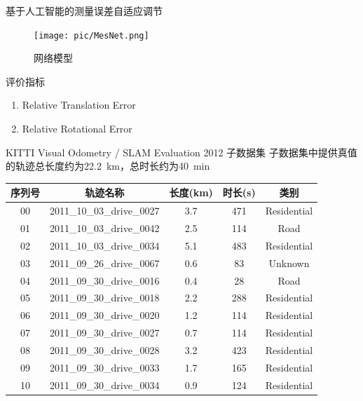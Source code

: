 \documentclass{beamer} %
\begin{document}
\begin{frame}{基于人工智能的测量误差自适应调节}
    \begin{figure}[htbp]
        \centering
        \texttt{[image: pic/MesNet.png]}
        \caption{网络模型}
    \end{figure}
\end{frame}

\begin{frame}{评价指标}
    \begin{enumerate}
        \item Relative Translation Error
        \item Relative Rotational Error
    \end{enumerate}
\end{frame}

\begin{frame}{KITTI Visual Odometry / SLAM Evaluation 2012 子数据集}
    子数据集中提供真值的轨迹总长度约为\qty{22.2}{\km}，总时长约为\qty{40}{\minute}
    \begin{table}
        \tiny
        \begin{tabular}{ccccc}
            \toprule
            序列号 & 轨迹名称 & 长度(\unit{\km}) & 时长(\unit{\s}) & 类别 \\
            \midrule
            00 & 2011\_10\_03\_drive\_0027 & 3.7 & 471 & Residential \\
            01 & 2011\_10\_03\_drive\_0042 & 2.5 & 114 & Road \\
            02 & 2011\_10\_03\_drive\_0034 & 5.1 & 483 & Residential \\
            03 & 2011\_09\_26\_drive\_0067 & 0.6 & 83  & Unknown  \\
            04 & 2011\_09\_30\_drive\_0016 & 0.4 & 28  & Road \\
            05 & 2011\_09\_30\_drive\_0018 & 2.2 & 288 & Residential \\
            06 & 2011\_09\_30\_drive\_0020 & 1.2 & 114 & Residential \\
            07 & 2011\_09\_30\_drive\_0027 & 0.7 & 114 & Residential \\
            08 & 2011\_09\_30\_drive\_0028 & 3.2 & 423 & Residential \\
            09 & 2011\_09\_30\_drive\_0033 & 1.7 & 165 & Residential \\
            10 & 2011\_09\_30\_drive\_0034 & 0.9 & 124 & Residential \\
            \bottomrule
        \end{tabular}
    \end{table}
\end{frame}
\end{document}
